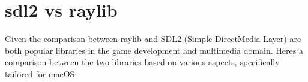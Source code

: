 \chapter{sdl2 vs raylib}
\hypertarget{md_docs_2own__docs_2sdl2___fundamentals_2sdl2__vs__raylib}{}\label{md_docs_2own__docs_2sdl2___fundamentals_2sdl2__vs__raylib}
\label{md_docs_2own__docs_2sdl2___fundamentals_2sdl2__vs__raylib_autotoc_md250}%
%

\begin{DoxyItemize}
\item Given the comparison between {\ttfamily raylib} and {\ttfamily SDL2} (Simple Direct\+Media Layer) are both popular libraries in the game development and multimedia domain. Here\textquotesingle{}s a comparison between the two libraries based on various aspects, specifically tailored for mac\+OS\+:
\end{DoxyItemize}

